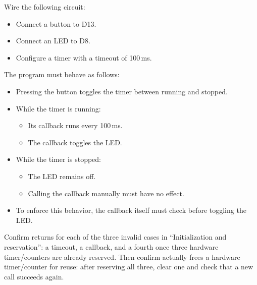 Wire the following circuit:
\begin{itemize}
  \item Connect a button to D13.
  \item Connect an LED to D8.
  \item Configure a timer with a timeout of 100\,ms.
\end{itemize}
The program must behave as follows:
\begin{itemize}
  \item Pressing the button toggles the timer between running and stopped.
  \item While the timer is running:
  \begin{itemize}
    \item Its callback runs every 100\,ms.
    \item The callback toggles the LED.
  \end{itemize}
  \item While the timer is stopped:
  \begin{itemize}
    \item The LED remains off.
    \item Calling the callback manually must have no effect.
  \end{itemize}
  \item To enforce this behavior, the callback itself must check  before
    toggling the LED.
\end{itemize}

Confirm  returns  for each of the three invalid cases in
``Initialization and reservation'': a  timeout, a  callback, and a fourth
 once three hardware timer/counters are already reserved. Then confirm
 actually frees a hardware timer/counter for reuse: after reserving all three,
clear one and check that a new  call succeeds again.

